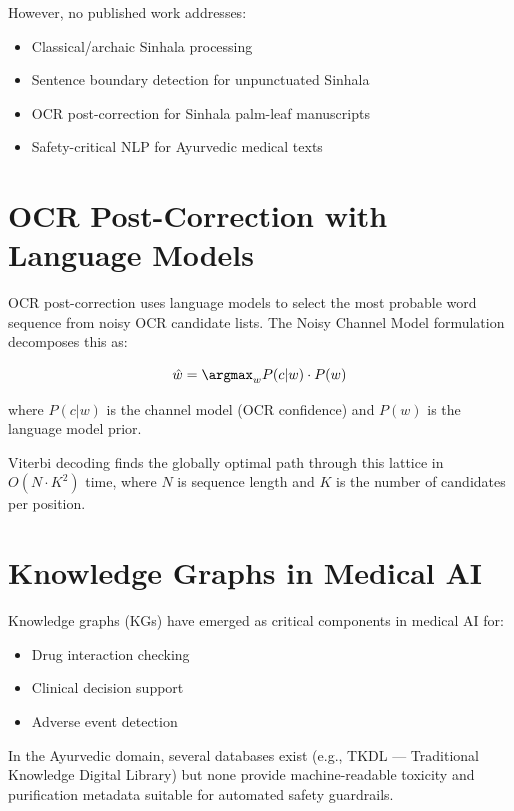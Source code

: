 \documentclass[12pt, a4paper, twoside]{report}
\begin{document}
However, no published work addresses:
\begin{itemize}
    \item Classical/archaic Sinhala processing
    \item Sentence boundary detection for unpunctuated Sinhala
    \item OCR post-correction for Sinhala palm-leaf manuscripts
    \item Safety-critical NLP for Ayurvedic medical texts
\end{itemize}

\section{OCR Post-Correction with Language Models}
\label{sec:ocr}

OCR post-correction uses language models to select the most probable word sequence from noisy OCR candidate lists. The Noisy Channel Model formulation \citep{brill2000improved} decomposes this as:

\begin{equation}
\hat{w} = \argmax_{w} P(c|w) \cdot P(w)
\label{eq:noisy-channel}
\end{equation}

where $P(c|w)$ is the channel model (OCR confidence) and $P(w)$ is the language model prior.

Viterbi decoding \citep{viterbi1967error} finds the globally optimal path through this lattice in $O(N \cdot K^2)$ time, where $N$ is sequence length and $K$ is the number of candidates per position.

\section{Knowledge Graphs in Medical AI}
\label{sec:kg-medical}

Knowledge graphs (KGs) have emerged as critical components in medical AI for:
\begin{itemize}
    \item Drug interaction checking \citep{lin2020kgnn}
    \item Clinical decision support \citep{santos2022clinical}
    \item Adverse event detection \citep{bean2017knowledge}
\end{itemize}

In the Ayurvedic domain, several databases exist (e.g., TKDL — Traditional Knowledge Digital Library) but none provide machine-readable toxicity and purification metadata suitable for automated safety guardrails.
\end{document}

